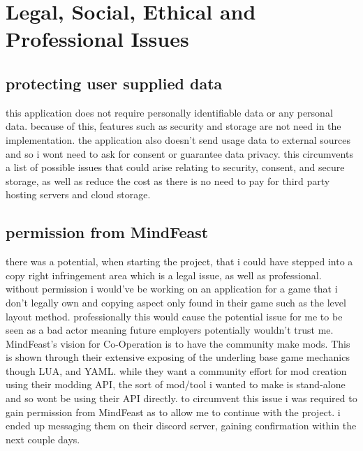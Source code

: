 
\section{Legal, Social, Ethical and Professional Issues}
\subsection{protecting user supplied data}
this application does not require personally identifiable data or any personal data. because of this, features such as security and storage are not need in the implementation. the application also doesn't send usage data to external sources and so i wont need to ask for consent or guarantee data privacy. this circumvents a list of possible issues that could arise relating to security, consent, and secure storage, as well as reduce the cost as there is no need to pay for third party hosting servers and cloud storage.

\subsection{permission from MindFeast}
there was a potential, when starting the project, that i could have stepped into a copy right infringement area which is a legal issue, as well as professional. without permission i would've be working on an application for a game that i don't legally own and copying aspect only found in their game such as the level layout method. 
professionally this would cause the potential issue for me to be seen as a bad actor meaning future employers potentially wouldn't trust me.
MindFeast's vision for Co-Operation is to have the community make mods. This is shown through their extensive exposing of the underling base game mechanics though LUA, and YAML. while they want a community effort for mod creation using their modding API, the sort of mod/tool i wanted to make is stand-alone and so wont be using their API directly. to circumvent this issue i was required to gain permission from MindFeast as to allow me to continue with the project. i ended up messaging them on their discord server, gaining confirmation within the next couple days.

